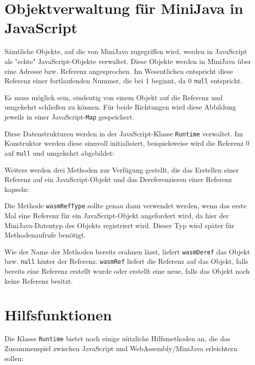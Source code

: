 \section{Objektverwaltung für MiniJava in JavaScript}

Sämtliche Objekte, auf die von MiniJava zugegriffen wird, werden in JavaScript als "echte" JavaScript-Objekte verwaltet. Diese Objekte werden in MiniJava über eine Adresse bzw. Referenz angesprochen. Im Wesentlichen entspricht diese Referenz einer fortlaufenden Nummer, die bei 1 beginnt, da 0 \lstinline{null} entspricht.

Es muss möglich sein, eindeutig von einem Objekt auf die Referenz und umgekehrt schließen zu können. Für beide Richtungen wird diese Abbildung jeweils in einer Java\-Script-\lstinline{Map} gespeichert.

Diese Datenstrukturen werden in der JavaScript-Klasse \lstinline{Runtime} verwaltet. Im Konstruktor werden diese sinnvoll initialisiert, beispielsweise wird die Referenz 0 auf \lstinline{null} und umgekehrt abgebildet:



Weiters werden drei Methoden zur Verfügung gestellt, die das Erstellen einer Referenz auf ein JavaScript-Objekt und das Dereferenzieren einer Referenz kapseln:



Die Methode \lstinline{wasmRefType} sollte genau dann verwendet werden, wenn das erste Mal eine Referenz für ein JavaScript-Objekt angefordert wird, da hier der MiniJava-Datentyp des Objekts registriert wird. Dieser Typ wird später für Methodenaufrufe benötigt.

Wie der Name der Methoden bereits erahnen lässt, liefert \lstinline{wasmDeref} das Objekt bzw. \lstinline{null} hinter der Referenz. \lstinline{wasmRef} liefert die Referenz auf das Objekt, falls bereits eine Referenz erstellt wurde oder erstellt eine neue, falls das Objekt noch keine Referenz besitzt.

\section{Hilfsfunktionen}

Die Klasse \lstinline{Runtime} bietet noch einige nützliche Hilfsmethoden an, die das Zusammenspiel zwischen JavaScript und WebAssembly/MiniJava erleichtern sollen:

